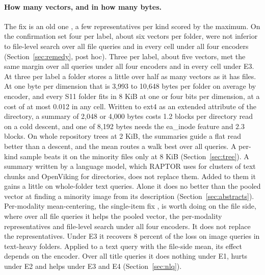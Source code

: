 \documentclass[11pt]{article}
\begin{document}
\paragraph{How many vectors, and in how many bytes.} The fix is an old one \citep{weston2013maxmf,pal2020pinnersage}, a few representatives per kind scored by the maximum. On the confirmation set four per label, about six vectors per folder, were not inferior to file-level search over all file queries and in every cell under all four encoders (Section~\ref{sec:remedy}, post hoc). Three per label, about five vectors, met the same margin over all queries under all four encoders and in every cell under E3. At three per label a folder stores a little over half as many vectors as it has files. At one byte per dimension that is 3,993 to 10,648 bytes per folder on average by encoder, and every S11 folder fits in 8 KiB at one or four bits per dimension, at a cost of at most 0.012 in any cell. Written to ext4 as an extended attribute of the directory, a summary of 2,048 or 4,000 bytes costs 1.2 blocks per directory read on a cold descent, and one of 8,192 bytes needs the ea\_inode feature and 2.3 blocks. On whole repository trees at 2 KiB, the summaries guide a flat read better than a descent, and the mean routes a walk best over all queries. A per-kind sample beats it on the minority files only at 8 KiB (Section~\ref{sec:tree}). A summary written by a language model, which RAPTOR uses for clusters of text chunks and OpenViking for directories, does not replace them. Added to them it gains a little on whole-folder text queries. Alone it does no better than the pooled vector at finding a minority image from its description (Section~\ref{sec:abstracts}). Per-modality mean-centering, the single-item fix \citep{li2025grclip}, is worth doing on the file side, where over all file queries it helps the pooled vector, the per-modality representatives and file-level search under all four encoders. It does not replace the representatives. Under E3 it recovers 8 percent of the loss on image queries in text-heavy folders. Applied to a text query with the file-side mean, its effect depends on the encoder. Over all title queries it does nothing under E1, hurts under E2 and helps under E3 and E4 (Section~\ref{sec:nlq}).
\end{document}
